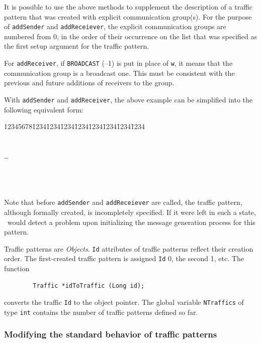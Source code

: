 It is possible to use the above methods to supplement the description of a
traffic pattern that was created with explicit communication group(s).
For the purpose of {\tt addSender} and {\tt addReceiever}, the explicit
communication groups are numbered from 0, in the order of their occurrence
on the list that was specified
as the first setup argument for the traffic pattern.

For {\tt addReceiver}, if {\tt BROADCAST} (--1) is put in place of {\tt w}, it
means that the communication group is a broadcast one.
This must be consistent with the previous and future additions of receivers 
to the group.

With {\tt addSender} and {\tt addReceiver},
the above example can be simplified into the following equivalent form:
{\tt\begin{tabbing}
12345678\=1234\=1234\=1234\=1234\=1234\=1234\=1234\=1234\kill
{}\\
\>{\tt \};}\\
\\
\> \ldots \\
\\
\\
\\
\end{tabbing}}

Note that before {\tt addSender} and {\tt addReceiever} are called, the
traffic pattern, although formally created, is incompletely specified.
If it were left in such a state, \smurph\ would detect a problem upon
initializing the message generation process for this pattern.

Traffic patterns are {\em Objects}.
{\tt Id} attributes of traffic patterns reflect their creation order.
The first-created traffic pattern is assigned {\tt Id} 0, the second 1, etc.
The function
\begin{verbatim}
        Traffic *idToTraffic (Long id);
\end{verbatim}
converts the traffic {\tt Id} to the object pointer.
The global variable {\tt NTraffics} of type {\tt int} contains the number
of traffic patterns defined so far.

\subsubsection{Modifying the standard behavior of traffic patterns}
\label{rm_cl_dt_mo}

